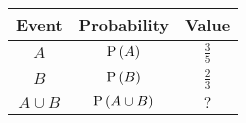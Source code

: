 \begin{tabular}{|c|c|c|} 
\hline
\textbf{Event} & \textbf{Probability} & \textbf{Value} \\
\hline
$A$ & $\text{P}\left(A\right)$ & $\frac{3}{5}$ \\
\hline
$B$ & $\text{P}\left(B\right)$ & $\frac{2}{3}$ \\
\hline
$A \cup B$ & $\text{P}\left(A \cup B\right)$ & $?$ \\
\hline
\end{tabular}